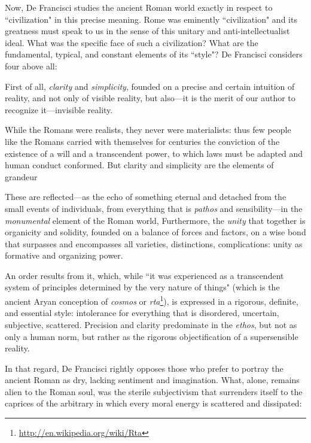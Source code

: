 Now, De Francisci studies the ancient Roman world exactly in respect to ``civilization" in this precise meaning. Rome was eminently ``civilization" and its greatness must speak to us in the sense of this unitary and anti-intellectualist ideal. What was the specific face of such a civilization? What are the fundamental, typical, and constant elements of its ``style"? De Francisci considers four above all:

First of all, \emph{clarity} and \emph{simplicity}, founded on a precise and certain intuition of reality, and not only of visible reality, but also—it is the merit of our author to recognize it—invisible reality.

\begin{quotex}
While the Romans were realists, they never were materialists: thus few people like the Romans carried with themselves for centuries the conviction of the existence of a will and a transcendent power, to which laws must be adapted and human conduct conformed. But clarity and simplicity are the elements of grandeur 

\end{quotex}
These are reflected—as the echo of something eternal and detached from the small events of individuals, from everything that is \emph{pathos} and sensibility—in the \emph{monumental} element of the Roman world, Furthermore, the \emph{unity} that together is organicity and solidity, founded on a balance of forces and factors, on a wise bond that surpasses and encompasses all varieties, distinctions, complications: unity as formative and organizing power.

An order results from it, which, while ``it was experienced as a transcendent system of principles determined by the very nature of things" (which is the ancient Aryan conception of \emph{cosmos} or \emph{rta}\footnote{\url{http://en.wikipedia.org/wiki/Rta}}), is expressed in a rigorous, definite, and essential style: intolerance for everything that is disordered, uncertain, subjective, scattered. Precision and clarity predominate in the \emph{ethos}, but not as only a human norm, but rather as the rigorous objectification of a supersensible reality.

In that regard, De Francisci rightly opposes those who prefer to portray the ancient Roman as dry, lacking sentiment and imagination. What, alone, remains alien to the Roman soul, was the sterile subjectivism that surrenders itself to the caprices of the arbitrary in which every moral energy is scattered and dissipated:

